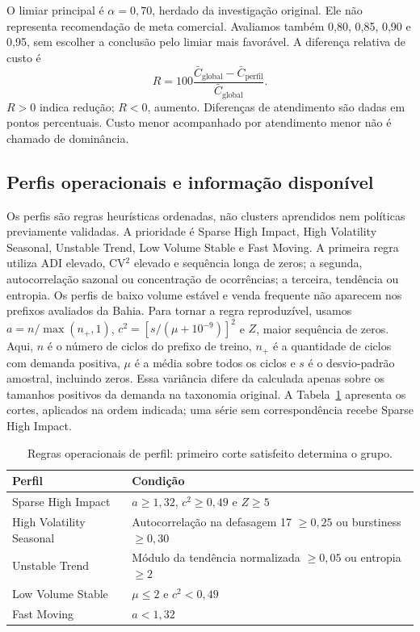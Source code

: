 \documentclass[preprint,12pt]{elsarticle}
\begin{document}
O limiar principal é $\alpha=0{,}70$, herdado da investigação original. Ele não representa recomendação de meta comercial. Avaliamos também 0,80, 0,85, 0,90 e 0,95, sem escolher a conclusão pelo limiar mais favorável. A diferença relativa de custo é
\begin{equation}
 R=100\frac{\bar C_{\mathrm{global}}-\bar C_{\mathrm{perfil}}}{\bar C_{\mathrm{global}}}.
\end{equation}
$R>0$ indica redução; $R<0$, aumento. Diferenças de atendimento são dadas em pontos percentuais. Custo menor acompanhado por atendimento menor não é chamado de dominância.

\subsection{Perfis operacionais e informação disponível}
Os perfis são regras heurísticas ordenadas, não clusters aprendidos nem políticas previamente validadas. A prioridade é Sparse High Impact, High Volatility Seasonal, Unstable Trend, Low Volume Stable e Fast Moving. A primeira regra utiliza ADI elevado, CV$^2$ elevado e sequência longa de zeros; a segunda, autocorrelação sazonal ou concentração de ocorrências; a terceira, tendência ou entropia. Os perfis de baixo volume estável e venda frequente não aparecem nos prefixos avaliados da Bahia. Para tornar a regra reproduzível, usamos $a=n/\max(n_+,1)$, $c^2=[s/(\mu+10^{-9})]^2$ e $Z$, maior sequência de zeros. Aqui, $n$ é o número de ciclos do prefixo de treino, $n_+$ é a quantidade de ciclos com demanda positiva, $\mu$ é a média sobre todos os ciclos e $s$ é o desvio-padrão amostral, incluindo zeros. Essa variância difere da calculada apenas sobre os tamanhos positivos da demanda na taxonomia original. A Tabela~\ref{tab:profile_rules} apresenta os cortes, aplicados na ordem indicada; uma série sem correspondência recebe Sparse High Impact.

\begin{table}[htbp]\centering\small
\caption{Regras operacionais de perfil: primeiro corte satisfeito determina o grupo.}\label{tab:profile_rules}
\begin{tabular}{@{}p{3.7cm}p{7.2cm}@{}}\toprule
Perfil & Condição\\\midrule
Sparse High Impact & $a\geq1{,}32$, $c^2\geq0{,}49$ e $Z\geq5$\\
High Volatility Seasonal & Autocorrelação na defasagem 17 $\geq0{,}25$ ou burstiness $\geq0{,}30$\\
Unstable Trend & Módulo da tendência normalizada $\geq0{,}05$ ou entropia $\geq2$\\
Low Volume Stable & $\mu\leq2$ e $c^2<0{,}49$\\
Fast Moving & $a<1{,}32$\\\bottomrule\end{tabular}\end{table}
\end{document}
